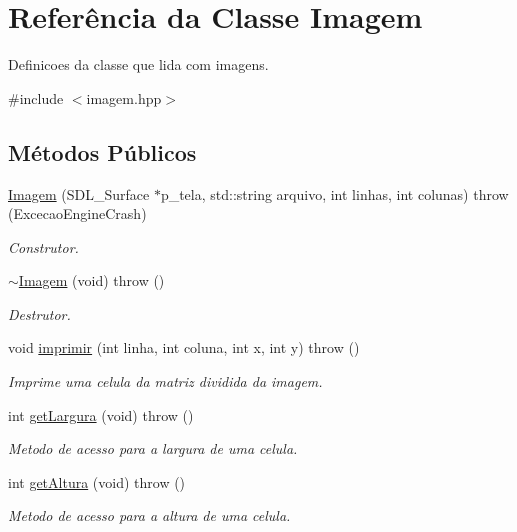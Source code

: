 \hypertarget{classImagem}{
\section{Referência da Classe Imagem}
\label{classImagem}
}


Definicoes da classe que lida com imagens.  




{\ttfamily \#include $<$imagem.hpp$>$}

\subsection*{Métodos Públicos}
\begin{DoxyCompactItemize}
\item 
\hyperlink{classImagem_a838fb6966bd204f60f5e527a63e6059c}{Imagem} (SDL\_\-Surface $\ast$p\_\-tela, std::string arquivo, int linhas, int colunas)  throw (ExcecaoEngineCrash)
\begin{DoxyCompactList}\small\item\em Construtor. \item\end{DoxyCompactList}\item 
\hypertarget{classImagem_ab0c3a402ec623a6050ad105332d6a40a}{
\hyperlink{classImagem_ab0c3a402ec623a6050ad105332d6a40a}{$\sim$Imagem} (void)  throw ()}
\label{classImagem_ab0c3a402ec623a6050ad105332d6a40a}

\begin{DoxyCompactList}\small\item\em Destrutor. \item\end{DoxyCompactList}\item 
void \hyperlink{classImagem_a7fa8fe7f059c1b7e08bbf0f89005b172}{imprimir} (int linha, int coluna, int x, int y)  throw ()
\begin{DoxyCompactList}\small\item\em Imprime uma celula da matriz dividida da imagem. \item\end{DoxyCompactList}\item 
int \hyperlink{classImagem_a80e4d0f649aa3d1e212b572177f6d5ec}{getLargura} (void)  throw ()
\begin{DoxyCompactList}\small\item\em Metodo de acesso para a largura de uma celula. \item\end{DoxyCompactList}\item 
int \hyperlink{classImagem_a2d2c465a25a6413d49f7943d59ad96e1}{getAltura} (void)  throw ()
\begin{DoxyCompactList}\small\item\em Metodo de acesso para a altura de uma celula. \item\end{DoxyCompactList}\end{DoxyCompactItemize}


